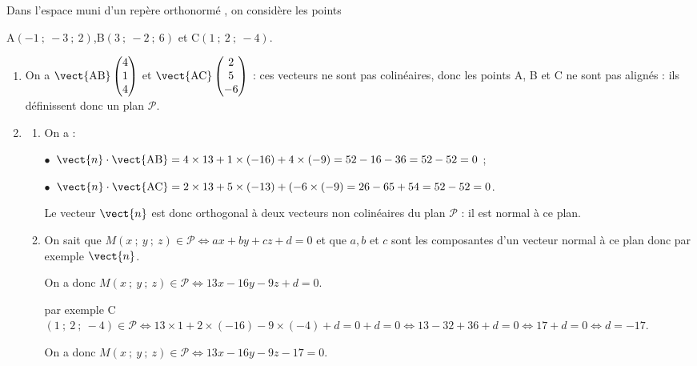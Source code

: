
\medskip

Dans l'espace muni d'un repère orthonormé \Oijk, on considère les
points
\begin{center}A$(-1~;~-3~;~2)$,\qquad B$(3~;~-2~;~6)$ \quad et \quad  C$(1~;~2~;~-4)$.\end{center}

\smallskip

\begin{enumerate}
\item %
On a $\vect{\text{AB}}\begin{pmatrix}4\\1\\4\end{pmatrix}$ et $\vect{\text{AC}}\begin{pmatrix}2\\5\\-6\end{pmatrix}$ : ces vecteurs ne sont pas colinéaires, donc les points A, B et C ne sont pas alignés : ils définissent donc un plan $\mathcal{P}$.
\item 
	\begin{enumerate}
		\item %
On a :

$\bullet~~$$\vect{n} \cdot \vect{\text{AB}} = 4 \times 13 + 1 \times (- 16) + 4 \times (-9) = 52 - 16 - 36 = 52 - 52 = 0$ ;

$\bullet~~$$\vect{n} \cdot \vect{\text{AC}} = 2 \times 13 + 5 \times (- 13) + (- 6 \times (-9) = 26 - 65 + 54  = 52 - 52 = 0$.

Le vecteur $\vect{n}$ est donc orthogonal à deux vecteurs non colinéaires du plan $\mathcal{P}$ : il est normal à ce plan.
		\item %
On sait que $M(x~;~y~;~z) \in \mathcal{P} \iff ax + by + cz + d = 0$ et que $a, b $ et $c$ sont les composantes d'un vecteur normal à ce plan donc par exemple $\vect{n}$.
		
On a donc $M(x~;~y~;~z) \in \mathcal{P} \iff 13x - 16y -9z + d = 0$.
		
par exemple C$(1~;~2~;~- 4) \in \mathcal{P} \iff 13\times 1 + 2\times  (-16) -9 \times (- 4) + d = 0   + d = 0 \iff 13 - 32 + 36 + d = 0 \iff 17 + d = 0 \iff d = - 17$.
		
On a donc $M(x~;~y~;~z) \in \mathcal{P} \iff 13x - 16y - 9z - 17 = 0$.
	\end{enumerate}
\end{enumerate}

